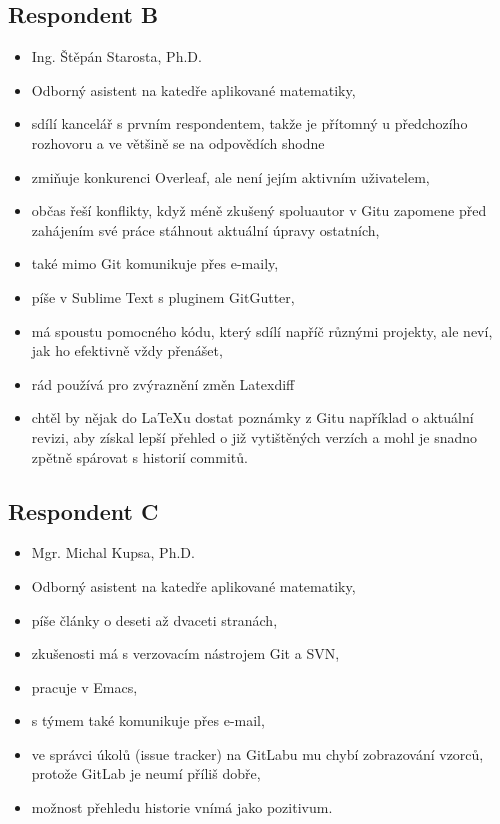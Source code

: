 \subsection{Respondent B}

\begin{itemize}
	\item Ing. Štěpán Starosta, Ph.D.
	\item Odborný asistent na katedře aplikované matematiky,
	\item sdílí kancelář s prvním respondentem, takže je přítomný u předchozího rozhovoru a ve většině se na odpovědích shodne
	\item zmiňuje konkurenci Overleaf, ale není jejím aktivním uživatelem,
	\item občas řeší konflikty, když méně zkušený spoluautor v Gitu zapomene před zahájením své práce stáhnout aktuální úpravy ostatních,
	\item také mimo Git komunikuje přes e-maily,
	\item píše v Sublime Text s pluginem GitGutter,
	\item má spoustu pomocného kódu, který sdílí napříč různými projekty, ale neví, jak ho efektivně vždy přenášet,
	\item rád používá pro zvýraznění změn Latexdiff
	\item chtěl by nějak do \LaTeX{u} dostat poznámky z Gitu například o aktuální revizi, aby získal lepší přehled o již vytištěných verzích a mohl je snadno zpětně spárovat s historií commitů.
\end{itemize}


\subsection{Respondent C}

\begin{itemize}
	\item Mgr. Michal Kupsa, Ph.D.
	\item Odborný asistent na katedře aplikované matematiky,
	\item píše články o deseti až dvaceti stranách,
	\item zkušenosti má s verzovacím nástrojem Git a SVN,
	\item pracuje v Emacs,
	\item s týmem také komunikuje přes e-mail,
	\item ve správci úkolů (issue tracker) na GitLabu mu chybí zobrazování vzorců, protože GitLab je neumí příliš dobře,
	\item možnost přehledu historie vnímá jako pozitivum.
\end{itemize}


